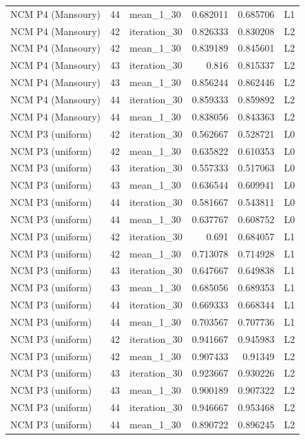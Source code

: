 \begin{table}[htbp!]
\begin{tabular}{lrlrrl}
NCM P4 (Mansoury) & 44 & mean\_1\_30 & 0.682011 & 0.685706 & L1 \\
NCM P4 (Mansoury) & 42 & iteration\_30 & 0.826333 & 0.830208 & L2 \\
NCM P4 (Mansoury) & 42 & mean\_1\_30 & 0.839189 & 0.845601 & L2 \\
NCM P4 (Mansoury) & 43 & iteration\_30 & 0.816 & 0.815337 & L2 \\
NCM P4 (Mansoury) & 43 & mean\_1\_30 & 0.856244 & 0.862446 & L2 \\
NCM P4 (Mansoury) & 44 & iteration\_30 & 0.859333 & 0.859892 & L2 \\
NCM P4 (Mansoury) & 44 & mean\_1\_30 & 0.838056 & 0.843363 & L2 \\
NCM P3 (uniform) & 42 & iteration\_30 & 0.562667 & 0.528721 & L0 \\
NCM P3 (uniform) & 42 & mean\_1\_30 & 0.635822 & 0.610353 & L0 \\
NCM P3 (uniform) & 43 & iteration\_30 & 0.557333 & 0.517063 & L0 \\
NCM P3 (uniform) & 43 & mean\_1\_30 & 0.636544 & 0.609941 & L0 \\
NCM P3 (uniform) & 44 & iteration\_30 & 0.581667 & 0.543811 & L0 \\
NCM P3 (uniform) & 44 & mean\_1\_30 & 0.637767 & 0.608752 & L0 \\
NCM P3 (uniform) & 42 & iteration\_30 & 0.691 & 0.684057 & L1 \\
NCM P3 (uniform) & 42 & mean\_1\_30 & 0.713078 & 0.714928 & L1 \\
NCM P3 (uniform) & 43 & iteration\_30 & 0.647667 & 0.649838 & L1 \\
NCM P3 (uniform) & 43 & mean\_1\_30 & 0.685056 & 0.689353 & L1 \\
NCM P3 (uniform) & 44 & iteration\_30 & 0.669333 & 0.668344 & L1 \\
NCM P3 (uniform) & 44 & mean\_1\_30 & 0.703567 & 0.707736 & L1 \\
NCM P3 (uniform) & 42 & iteration\_30 & 0.941667 & 0.945983 & L2 \\
NCM P3 (uniform) & 42 & mean\_1\_30 & 0.907433 & 0.91349 & L2 \\
NCM P3 (uniform) & 43 & iteration\_30 & 0.923667 & 0.930226 & L2 \\
NCM P3 (uniform) & 43 & mean\_1\_30 & 0.900189 & 0.907322 & L2 \\
NCM P3 (uniform) & 44 & iteration\_30 & 0.946667 & 0.953468 & L2 \\
NCM P3 (uniform) & 44 & mean\_1\_30 & 0.890722 & 0.896245 & L2 \\

\end{tabular}
\end{table}
